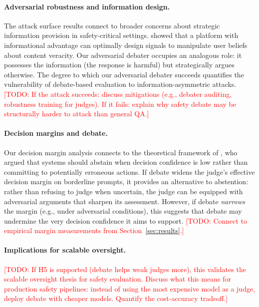 \documentclass[preprint]{article}
\newcommand{\todo}[1]{\textcolor{red}{[TODO: #1]}}
\begin{document}
\paragraph{Adversarial robustness and information design.} The attack surface results connect to broader concerns about strategic information provision in safety-critical settings. \citet{hossain2024persuasion} showed that a platform with informational advantage can optimally design signals to manipulate user beliefs about content veracity. Our adversarial debater occupies an analogous role: it possesses the information (the response is harmful) but strategically argues otherwise. The degree to which our adversarial debater succeeds quantifies the vulnerability of debate-based evaluation to information-asymmetric attacks. \todo{If the attack succeeds: discuss mitigations (e.g., debater auditing, robustness training for judges). If it fails: explain why safety debate may be structurally harder to attack than general QA.}

\paragraph{Decision margins and debate.} Our decision margin analysis connects to the theoretical framework of \citet{tanwisuth2025arlet}, who argued that systems should abstain when decision confidence is low rather than committing to potentially erroneous actions. If debate widens the judge's effective decision margin on borderline prompts, it provides an alternative to abstention: rather than refusing to judge when uncertain, the judge can be equipped with adversarial arguments that sharpen its assessment. However, if debate \emph{narrows} the margin (e.g., under adversarial conditions), this suggests that debate may undermine the very decision confidence it aims to support. \todo{Connect to empirical margin measurements from Section~\ref{sec:results}.}

\paragraph{Implications for scalable oversight.} \todo{If H5 is supported (debate helps weak judges more), this validates the scalable oversight thesis for safety evaluation. Discuss what this means for production safety pipelines: instead of using the most expensive model as a judge, deploy debate with cheaper models. Quantify the cost-accuracy tradeoff.}
\end{document}
